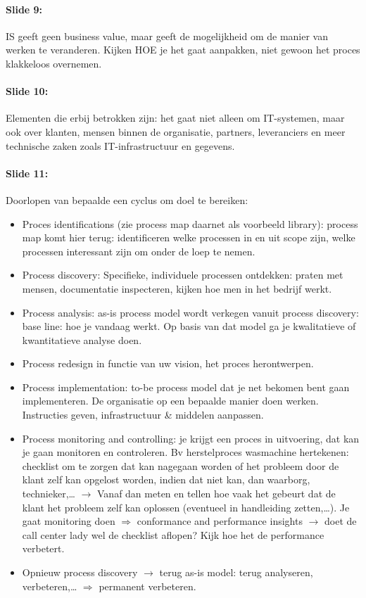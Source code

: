 \documentclass[10pt,a4paper]{report}
\begin{document}
\paragraph{Slide 9:}IS geeft geen business value, maar geeft de mogelijkheid om de manier van werken te veranderen. Kijken HOE je het gaat aanpakken, niet gewoon het proces klakkeloos overnemen.

\paragraph{Slide 10:}Elementen die erbij betrokken zijn: het gaat niet alleen om IT-systemen, maar ook over klanten, mensen binnen de organisatie, partners, leveranciers en meer technische zaken zoals IT-infrastructuur en gegevens.

\paragraph{Slide 11:}Doorlopen van bepaalde een cyclus om doel te bereiken:
\begin{itemize}
\item Proces identifications (zie process map daarnet als voorbeeld library): process map komt hier terug: identificeren welke processen in en uit scope zijn, welke processen interessant zijn om onder de loep te nemen.
\item Process discovery: Specifieke, individuele processen ontdekken: praten met mensen, documentatie inspecteren, kijken hoe men in het bedrijf werkt.
\item Process analysis: as-is process model wordt verkegen vanuit process discovery: base line: hoe je vandaag werkt. Op basis van dat model ga je kwalitatieve of kwantitatieve analyse doen.
\item Process redesign in functie van uw vision, het proces herontwerpen.
\item Process implementation: to-be process model dat je net bekomen bent gaan implementeren. De organisatie op een bepaalde manier doen werken. Instructies geven, infrastructuur \& middelen aanpassen.
\item Process monitoring and controlling: je krijgt een proces in uitvoering, dat kan je gaan monitoren en controleren. Bv herstelproces wasmachine hertekenen: checklist om te zorgen dat kan nagegaan worden of het probleem door de klant zelf kan opgelost worden, indien dat niet kan, dan waarborg, technieker,… $\rightarrow$ Vanaf dan meten en tellen hoe vaak het gebeurt dat de klant het probleem zelf kan oplossen (eventueel in handleiding zetten,…). Je gaat monitoring doen $\Rightarrow$ conformance and performance insights $\rightarrow$ doet de call center lady wel de checklist aflopen? Kijk hoe het de performance verbetert.
\item Opnieuw process discovery $\rightarrow$ terug as-is model: terug analyseren, verbeteren,… $\Rightarrow$ permanent verbeteren.
\end{itemize}
\end{document}
